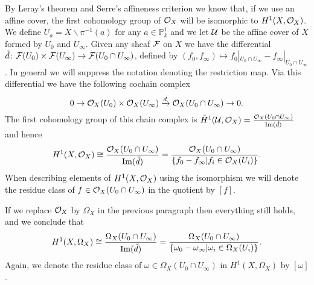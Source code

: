 By Leray's theorem \cite[Thm.\ 5.2.12]{liu} and Serre's affineness criterion \cite[Thm.\ 5.2.23]{liu} we know that, if we use an affine cover, the first \cech cohomology group of ${\cal O}_X$ will be isomorphic to $H^1(X,\mathcal{O}_X)$.
We define $U_a = X \backslash \pi^{-1}(a)$ for any $a \in \mathbb P_k^1$ and we let ${\cal U}$ be the affine cover of $X$ formed by $U_0$ and $U_\infty$.
Given any sheaf $\cal F$ on $X$ we have the \cech differential $\check{d}\colon {\cal F}(U_0) \times {\cal F} (U_\infty) \rightarrow {\cal F}(U_0 \cap U_\infty)$, defined by $(f_0,f_\infty) \mapsto f_0|_{U_0 \cap U_\infty} - f_\infty|_{U_0 \cap U_\infty}$.
In general we will suppress the notation denoting the restriction map.
Via this differential we have the following cochain complex
    \begin{equation*}
    0 \rightarrow {\cal O}_X(U_0)\times {\cal O}_X(U_\infty) \xrightarrow{\check{d}} {\cal O}_X(U_0 \cap U_\infty) \rightarrow 0.
    \end{equation*}
The first cohomology group of this chain complex is $\check{H}^1(\mathcal U,\mathcal O_X) = \frac{{\cal O}_X(U_0 \cap U_\infty)}{\operatorname{Im}(\check{d})}$ and hence
    \begin{equation}\label{equationcechhoneisomorphismfunctions}
    H^1(X,\mathcal{O}_X) \cong \frac{{\cal O}_X(U_0 \cap U_\infty)}{\operatorname{Im}(\check{d})}  
     = \frac{{\cal O}_X(U_0 \cap U_\infty)}{\{f_0 - f_\infty | f_i \in {\cal O}_X(U_i) \}}.
    \end{equation}
When describing elements of $H^1(X,\mathcal{O}_X)$ using the isomorphism we will denote the residue class of $f \in {\cal O}_X(U_0 \cap U_\infty)$ in the quotient by $[f]$.

If we replace ${\cal O}_X$ by $\Omega_X$ in the previous paragraph then everything still holds, and we conclude that
    \begin{equation}\label{equationcechhoneisomorphismdifferentials}
    H^1(X,\Omega_X) \cong \frac{\Omega_X(U_0 \cap U_\infty)}{\operatorname{Im}(\check{d})} = \frac{\Omega_X(U_0 \cap U_\infty)}{\{\omega_0 - \omega_ \infty | \omega_i \in \Omega_X(U_i)\}}.
    \end{equation}
Again, we denote the residue class of $\omega \in \Omega_X(U_0 \cap U_\infty)$ in $H^1(X,\Omega_X)$ by $[\omega]$.

